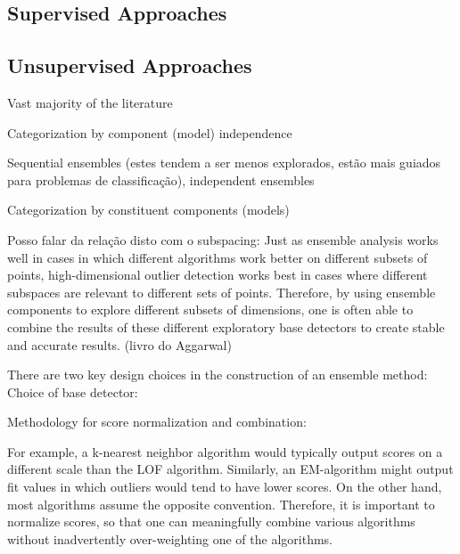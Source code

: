 

\subsection{Supervised Approaches}

\subsection{Unsupervised Approaches}

Vast majority of the literature

Categorization by component (model) independence

Sequential ensembles (estes tendem a ser menos explorados, estão mais guiados para problemas de classificação), independent ensembles

Categorization by constituent components (models)

Posso falar da relação disto com o subspacing: Just as ensemble analysis works well in cases in which different algorithms work better on different subsets of points, high-dimensional outlier detection works best in cases where different subspaces are relevant to different sets of points. Therefore, by using ensemble components to explore different subsets of dimensions, one is often able to combine the results of these different exploratory base detectors to create stable and accurate results. (livro do Aggarwal)

There are two key design choices in the construction of an ensemble method:
Choice of base detector:



Methodology for score normalization and combination:

For example, a k-nearest neighbor algorithm would typically output scores on a different scale than the LOF algorithm. Similarly, an EM-algorithm might output fit values in which outliers would tend to have lower scores. On the other hand, most algorithms assume the opposite convention. Therefore, it is important to normalize scores, so that one can meaningfully combine various algorithms without inadvertently over-weighting one of the algorithms.

